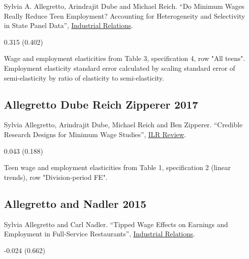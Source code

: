 \noindent Sylvia A. Allegretto, Arindrajit Dube and Michael Reich. ``Do Minimum Wages Really Reduce Teen Employment? Accounting for Heterogeneity and Selectivity in State Panel Data'', \href{https://doi.org/10.1111/j.1468-232X.2011.00634.x}{Industrial Relations}.

\vspace{0.7em}

 0.315 (0.402)

\vspace{0.7em}

 Wage and employment elasticities from Table 3, specification 4, row "All teens". Employment elasticity standard error calculated by scaling standard error of semi-elasticity by ratio of elasticity to semi-elasticity.

\subsection*{Allegretto Dube Reich Zipperer 2017}
\vspace{-0.7em}

\noindent Sylvia Allegretto, Arindrajit Dube, Michael Reich and Ben Zipperer. ``Credible Research Designs for Minimum Wage Studies'', \href{https://doi.org/10.1177/0019793917692788}{ILR Review}.

\vspace{0.7em}

 0.043 (0.188)

\vspace{0.7em}

 Teen wage and employment elasticities from Table 1, specification 2 (linear trends), row "Division-period FE".

\subsection*{Allegretto and Nadler 2015}
\vspace{-0.7em}

\noindent Sylvia Allegretto and Carl Nadler. ``Tipped Wage Effects on Earnings and Employment in Full-Service Restaurants'', \href{https://doi.org/10.1111/irel.12108}{Industrial Relations}.

\vspace{0.7em}

 -0.024 (0.662)

